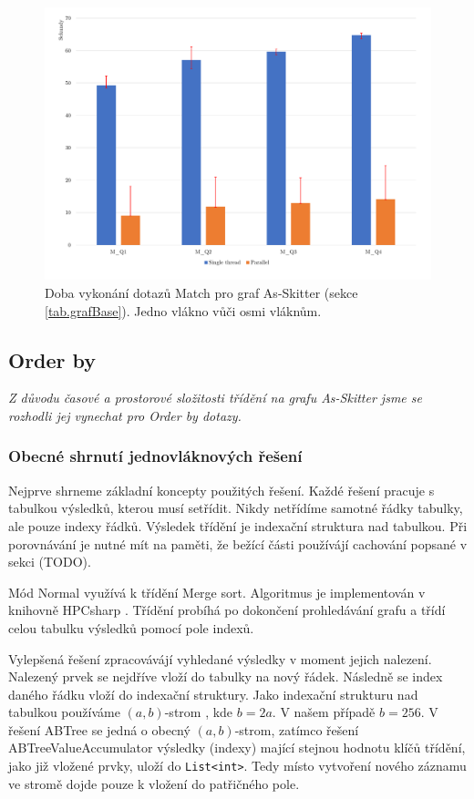 \begin{figure}[!htp]
\includegraphics[width=\linewidth]{../img/skitterMatch.pdf}\centering
\caption{Doba vykonání dotazů Match pro graf As-Skitter (sekce \ref{tab.grafBase}). Jedno vlákno vůči osmi vláknům.}
\label{figure.skitterMatch}
\end{figure}


\subsection{Order by}

\textit{Z důvodu časové a prostorové složitosti třídění na grafu As-Skitter jsme se rozhodli jej vynechat pro Order by dotazy.}

\subsubsection{Obecné shrnutí jednovláknových řešení}

Nejprve shrneme základní koncepty použitých řešení.
Každé řešení pracuje s tabulkou výsledků, kterou musí setřídit.
Nikdy netřídíme samotné řádky tabulky, ale pouze indexy řádků.
Výsledek třídění je indexační struktura nad tabulkou.
Při porovnávání je nutné mít na paměti, že bežící části používájí cachování popsané v sekci (TODO).  

Mód Normal využívá k třídění Merge sort.
Algoritmus je implementován v knihovně HPCsharp \citep{hpcsharp}.
Třídění probíhá po dokončení prohledávání grafu a třídí celou tabulku výsledků pomocí pole indexů.

Vylepšená řešení zpracovávájí vyhledané výsledky v moment jejich nalezení.
Nalezený prvek se nejdříve vloží do tabulky na nový řádek. 
Následně se index daného řádku vloží do indexační struktury. 
Jako indexační strukturu nad tabulkou používáme $(a, b)$-strom \citep[03. (a,b)-trees]{dataLecture}, kde $b=2a$.
V našem případě $b=256$.
V řešení ABTree se jedná o obecný $(a, b)$-strom, zatímco řešení ABTreeValueAccumulator výsledky (indexy) mající stejnou hodnotu klíčů třídění, jako již vložené prvky, uloží do \verb+List<int>+.
Tedy místo vytvoření nového záznamu ve stromě dojde pouze k vložení do patřičného pole.

